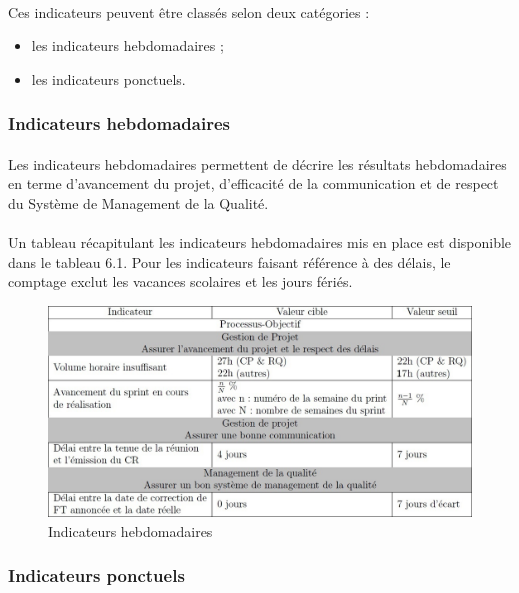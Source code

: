\paragraph*{} Ces indicateurs peuvent être classés selon deux catégories :
\begin{itemize} 
	\item les indicateurs hebdomadaires ;
	\item les indicateurs ponctuels.
 \end{itemize}

\subsubsection*{Indicateurs hebdomadaires}
\label{Indicateurs hebdomadaires}
\paragraph*{} Les indicateurs hebdomadaires permettent de décrire les résultats hebdomadaires en terme
d'avancement du projet, d'efficacité de la communication et de respect du Système de Management de la Qualité.

\paragraph*{} Un tableau récapitulant les indicateurs hebdomadaires mis en place est disponible dans le
tableau 6.1. Pour les indicateurs faisant référence à des délais, le comptage exclut les vacances
scolaires et les jours fériés.
\begin{figure}[h]
   \center
   \caption{\label{Tableau 6.1} Indicateurs hebdomadaires}
   \includegraphics[width=13cm]{./images/Indicateurs_hebdomadaires.jpg}
\end{figure}

\subsubsection*{Indicateurs ponctuels}
\label{Indicateurs ponctuels}
